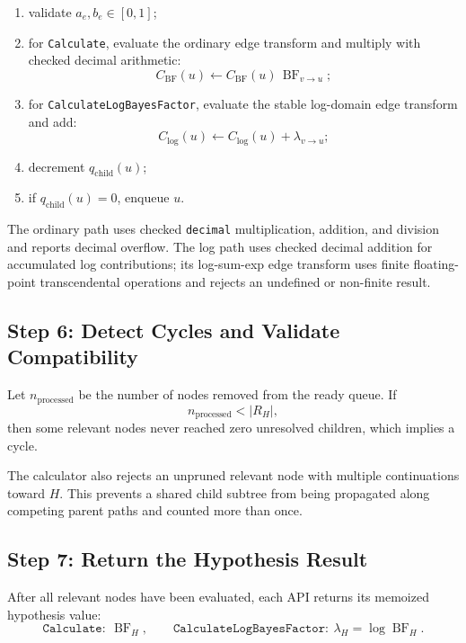 \documentclass[11pt]{article}
\newcommand{\BF}{\operatorname{BF}}
\begin{document}
\begin{enumerate}
    \item validate \(a_e,b_e\in[0,1]\);
    \item for \texttt{Calculate}, evaluate the ordinary edge transform and
          multiply with checked decimal arithmetic:
          \[
              C_{\BF}(u)
                \leftarrow
              C_{\BF}(u)\,\BF_{v\rightarrow u};
          \]
    \item for \texttt{CalculateLogBayesFactor}, evaluate the stable log-domain
          edge transform and add:
          \[
              C_{\log}(u)
                \leftarrow
              C_{\log}(u)+\lambda_{v\rightarrow u};
          \]
    \item decrement \(q_{\mathrm{child}}(u)\);
    \item if \(q_{\mathrm{child}}(u)=0\), enqueue \(u\).
\end{enumerate}

The ordinary path uses checked \texttt{decimal} multiplication, addition, and
division and reports decimal overflow.  The log path uses checked decimal
addition for accumulated log contributions; its log-sum-exp edge transform
uses finite floating-point transcendental operations and rejects an undefined
or non-finite result.

\subsection{Step 6: Detect Cycles and Validate Compatibility}

Let \(n_{\mathrm{processed}}\) be the number of nodes removed from the ready
queue.  If
\[
    n_{\mathrm{processed}}<|R_H|,
\]
then some relevant nodes never reached zero unresolved children, which implies
a cycle.

The calculator also rejects an unpruned relevant node with multiple
continuations toward \(H\).  This prevents a shared child subtree from being
propagated along competing parent paths and counted more than once.

\subsection{Step 7: Return the Hypothesis Result}

After all relevant nodes have been evaluated, each API returns its memoized
hypothesis value:
\[
    \texttt{Calculate}:\ \BF_H,
    \qquad
    \texttt{CalculateLogBayesFactor}:\ \lambda_H=\log\BF_H.
\]
\end{document}
